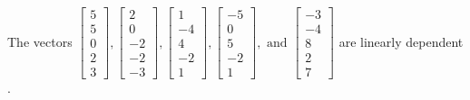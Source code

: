 \begin{exercise}
\begin{exerciseStatement}
  \end{exerciseStatement}
  \begin{exerciseAnswer}
   The vectors \(\left[\begin{array}{r}
5 \\
5 \\
0 \\
2 \\
3
\end{array}\right] , \left[\begin{array}{r}
2 \\
0 \\
-2 \\
-2 \\
-3
\end{array}\right] , \left[\begin{array}{r}
1 \\
-4 \\
4 \\
-2 \\
1
\end{array}\right] , \left[\begin{array}{r}
-5 \\
0 \\
5 \\
-2 \\
1
\end{array}\right] , \text{ and } \left[\begin{array}{r}
-3 \\
-4 \\
8 \\
2 \\
7
\end{array}\right]\) are 
  	 linearly dependent  .
  


  \end{exerciseAnswer}
\end{exercise}